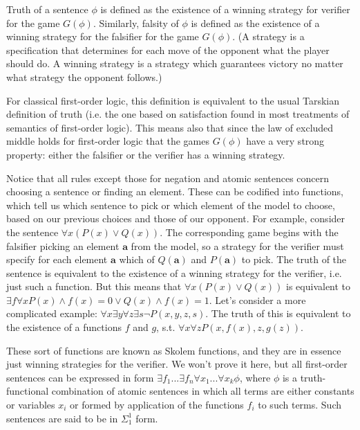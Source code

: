 \documentclass[12pt]{article}
\begin{document}
Truth of a sentence $\phi$ is defined as the existence of a winning strategy for verifier for the game $G(\phi)$. Similarly, falsity of $\phi$ is defined as the existence of a winning strategy for the falsifier for the game $G(\phi)$. (A strategy is a specification that determines for each move of the opponent what the player should do. A winning strategy is a strategy which guarantees victory no matter what strategy the opponent follows.)

For classical first-order logic, this definition is equivalent to the usual Tarskian definition of truth (i.e. the one based on satisfaction found in most treatments of semantics of first-order logic). This means also that since the law of excluded middle holds for first-order logic that the games $G(\phi)$ have a very strong property: either the falsifier or the verifier has a winning strategy.

Notice that all rules except those for negation and atomic sentences concern choosing a sentence or finding an element. These can be codified into functions, which tell us which sentence to pick or which element of the model to choose, based on our previous choices and those of our opponent. For example, consider the sentence $\forall x( P(x) \vee Q(x))$. The corresponding game begins with the falsifier picking an element $\mathbf{a}$ from the model, so a strategy for the verifier must specify for each element $\mathbf{a}$ which of $Q(\mathbf{a})$ and $P(\mathbf{a})$ to pick. The truth of the sentence is equivalent to the existence of a winning strategy for the verifier, i.e. just such a function. But this means that $\forall x( P(x) \vee Q(x))$ is equivalent to $\exists f \forall x P(x) \wedge f(x) = 0 \vee Q(x) \wedge f(x) = 1$. Let's consider a more complicated example: $\forall x \exists y \forall z \exists s \neg P(x,y,z,s)$. The truth of this is equivalent to the existence of a functions $f$ and $g$, s.t. $\forall x \forall z P(x,f(x),z,g(z))$.

These sort of functions are known as Skolem functions, and they are in essence just winning strategies for the verifier. We won't prove it here, but all first-order sentences can be expressed in form $\exists f_1 ... \exists f_n \forall x_1 ... \forall x_k \phi$, where $\phi$ is a truth-functional combination of atomic sentences in which all terms are either constants or variables $x_i$ or formed by application of the functions $f_i$ to such terms. Such sentences are said to be in $\Sigma^1_1$ form.
\end{document}
